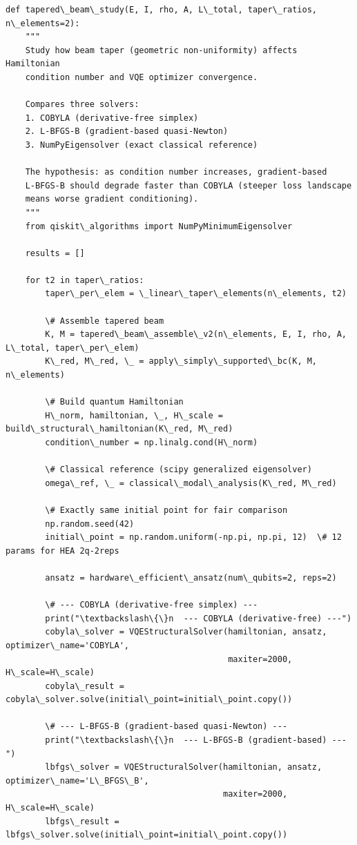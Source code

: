 \documentclass[12pt, a4paper]{article}
\begin{document}
\begin{lstlisting}[style=codestyle, caption={{novel_study.py --- Ill-Conditioning & Damage Detection}}]
def tapered\_beam\_study(E, I, rho, A, L\_total, taper\_ratios, n\_elements=2):
    """
    Study how beam taper (geometric non-uniformity) affects Hamiltonian
    condition number and VQE optimizer convergence.

    Compares three solvers:
    1. COBYLA (derivative-free simplex)
    2. L-BFGS-B (gradient-based quasi-Newton)
    3. NumPyEigensolver (exact classical reference)

    The hypothesis: as condition number increases, gradient-based
    L-BFGS-B should degrade faster than COBYLA (steeper loss landscape
    means worse gradient conditioning).
    """
    from qiskit\_algorithms import NumPyMinimumEigensolver

    results = []

    for t2 in taper\_ratios:
        taper\_per\_elem = \_linear\_taper\_elements(n\_elements, t2)

        \# Assemble tapered beam
        K, M = tapered\_beam\_assemble\_v2(n\_elements, E, I, rho, A, L\_total, taper\_per\_elem)
        K\_red, M\_red, \_ = apply\_simply\_supported\_bc(K, M, n\_elements)

        \# Build quantum Hamiltonian
        H\_norm, hamiltonian, \_, H\_scale = build\_structural\_hamiltonian(K\_red, M\_red)
        condition\_number = np.linalg.cond(H\_norm)

        \# Classical reference (scipy generalized eigensolver)
        omega\_ref, \_ = classical\_modal\_analysis(K\_red, M\_red)

        \# Exactly same initial point for fair comparison
        np.random.seed(42)
        initial\_point = np.random.uniform(-np.pi, np.pi, 12)  \# 12 params for HEA 2q-2reps

        ansatz = hardware\_efficient\_ansatz(num\_qubits=2, reps=2)

        \# --- COBYLA (derivative-free simplex) ---
        print("\textbackslash\{\}n  --- COBYLA (derivative-free) ---")
        cobyla\_solver = VQEStructuralSolver(hamiltonian, ansatz, optimizer\_name='COBYLA',
                                             maxiter=2000, H\_scale=H\_scale)
        cobyla\_result = cobyla\_solver.solve(initial\_point=initial\_point.copy())

        \# --- L-BFGS-B (gradient-based quasi-Newton) ---
        print("\textbackslash\{\}n  --- L-BFGS-B (gradient-based) ---")
        lbfgs\_solver = VQEStructuralSolver(hamiltonian, ansatz, optimizer\_name='L\_BFGS\_B',
                                            maxiter=2000, H\_scale=H\_scale)
        lbfgs\_result = lbfgs\_solver.solve(initial\_point=initial\_point.copy())


\end{lstlisting}
\end{document}
